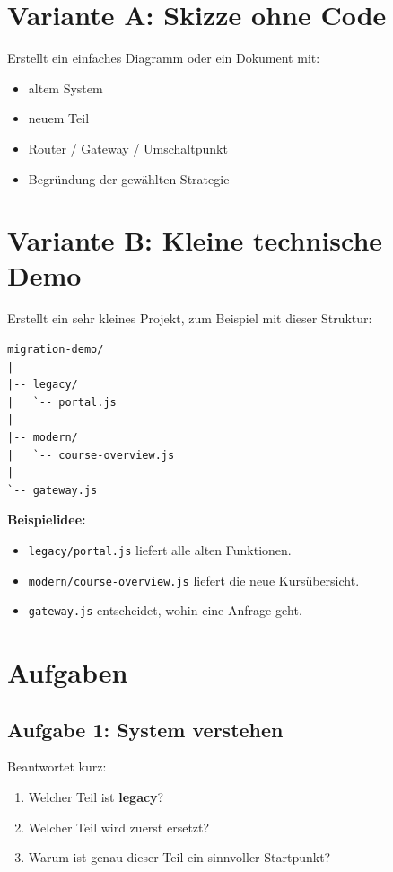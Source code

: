 \documentclass[a4paper,12pt]{article}
\begin{document}
\section*{Variante A: Skizze ohne Code}

Erstellt ein einfaches Diagramm oder ein Dokument mit:

\begin{itemize}
\item altem System
\item neuem Teil
\item Router / Gateway / Umschaltpunkt
\item Begründung der gewählten Strategie
\end{itemize}

\section*{Variante B: Kleine technische Demo}

Erstellt ein sehr kleines Projekt, zum Beispiel mit dieser Struktur:

\begin{lstlisting}
migration-demo/
|
|-- legacy/
|   `-- portal.js
|
|-- modern/
|   `-- course-overview.js
|
`-- gateway.js
\end{lstlisting}

\textbf{Beispielidee:}
\begin{itemize}
\item \texttt{legacy/portal.js} liefert alle alten Funktionen.
\item \texttt{modern/course-overview.js} liefert die neue Kursübersicht.
\item \texttt{gateway.js} entscheidet, wohin eine Anfrage geht.
\end{itemize}

\section*{Aufgaben}

\subsection*{Aufgabe 1: System verstehen}
Beantwortet kurz:
\begin{enumerate}
\item Welcher Teil ist \textbf{legacy}?
\item Welcher Teil wird zuerst ersetzt?
\item Warum ist genau dieser Teil ein sinnvoller Startpunkt?
\end{enumerate}
\end{document}
